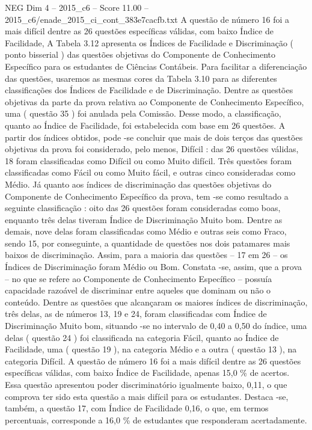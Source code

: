 \begin{textsample}{NEG Dim 4 – 2015\_c6 – Score 11.00 – 2015\_c6/enade\_2015\_ci\_cont\_383e7cacfb.txt}
A questão de número 16 foi a mais difícil dentre as 26 questões específicas válidas, com baixo Índice de Facilidade, A Tabela 3.12 apresenta os Índices de Facilidade e Discriminação ( ponto bisserial ) das questões objetivas do Componente de Conhecimento Específico para os estudantes de Ciências Contábeis.
Para facilitar a diferenciação das questões, usaremos as mesmas cores da Tabela 3.10 para as diferentes classificações dos Índices de Facilidade e de Discriminação.
Dentre as questões objetivas da parte da prova relativa ao Componente de Conhecimento Específico, uma ( questão 35 ) foi anulada pela Comissão.
Desse modo, a classificação, quanto ao Índice de Facilidade, foi estabelecida com base em 26 questões.
A partir dos índices obtidos, pode -se concluir que mais de dois terços das questões objetivas da prova foi considerado, pelo menos, Difícil : das 26 questões válidas, 18 foram classificadas como Difícil ou como Muito difícil.
Três questões foram classificadas como Fácil ou como Muito fácil, e outras cinco consideradas como Médio.
Já quanto aos índices de discriminação das questões objetivas do Componente de Conhecimento Específico da prova, tem -se como resultado a seguinte classificação : oito das 26 questões foram consideradas como boas, enquanto três delas tiveram Índice de Discriminação Muito bom.
Dentre as demais, nove delas foram classificadas como Médio e outras seis como Fraco, sendo 15, por conseguinte, a quantidade de questões nos dois patamares mais baixos de discriminação.
Assim, para a maioria das questões – 17 em 26 – os Índices de Discriminação foram Médio ou Bom.
Constata -se, assim, que a prova – no que se refere ao Componente de Conhecimento Específico – possuía capacidade razoável de discriminar entre aqueles que dominam ou não o conteúdo.
Dentre as questões que alcançaram os maiores índices de discriminação, três delas, as de números 13, 19 e 24, foram classificadas com Índice de Discriminação Muito bom, situando -se no intervalo de 0,40 a 0,50 do índice, uma delas ( questão 24 ) foi classificada na categoria Fácil, quanto ao Índice de Facilidade, uma ( questão 19 ), na categoria Médio e a outra ( questão 13 ), na categoria Difícil.
A questão de número 16 foi a mais difícil dentre as 26 questões específicas válidas, com baixo Índice de Facilidade, apenas 15,0 \% de acertos.
Essa questão apresentou poder discriminatório igualmente baixo, 0,11, o que comprova ter sido esta questão a mais difícil para os estudantes.
Destaca -se, também, a questão 17, com Índice de Facilidade 0,16, o que, em termos percentuais, corresponde a 16,0 \% de estudantes que responderam acertadamente.

\end{textsample}
